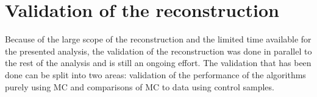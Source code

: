 %
\section{Validation of the reconstruction}
\label{sec:ReconstructionValidation}
Because of the large scope of the reconstruction and the limited time available for the presented analysis, the validation of the reconstruction was done in parallel to the rest of the analysis and is still an ongoing effort.  The validation that has been done can be split into two areas: validation of the performance of the algorithms purely using MC and comparisons of MC to data using control samples.
